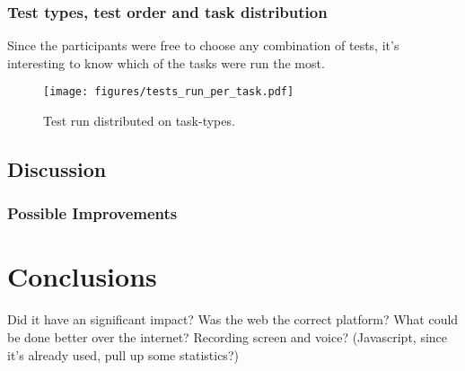 \documentclass[nofilelist]{cslthse-msc}
\begin{document}
      \subsection{Test types, test order and task distribution}

        Since the participants were free to choose any combination of tests,
        it's interesting to know which of the tasks were run the most.

				\begin{figure}[h!]
					\centering
					\texttt{[image: figures/tests\_run\_per\_task.pdf]}
					\caption{Test run distributed on task-types.}
				\end{figure}



		\section{Discussion}

			\subsection{Possible Improvements}

	\chapter{Conclusions}

		Did it have an significant impact? Was the web the correct platform? What
		could be done better over the internet? Recording screen and voice?
		(Javascript, since it's already used, pull up some statistics?)


	\checkoddpage
	\ifoddpage
	\else
		 \newpage
		 \thispagestyle{empty}
		 \mbox{ }
	\fi
\end{document}

